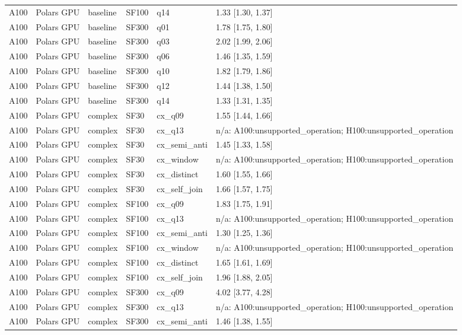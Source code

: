 \begin{longtable}{llllll}
A100 & Polars GPU & baseline & SF100 & q14 & 1.33 [1.30, 1.37] \\
A100 & Polars GPU & baseline & SF300 & q01 & 1.78 [1.75, 1.80] \\
A100 & Polars GPU & baseline & SF300 & q03 & 2.02 [1.99, 2.06] \\
A100 & Polars GPU & baseline & SF300 & q06 & 1.46 [1.35, 1.59] \\
A100 & Polars GPU & baseline & SF300 & q10 & 1.82 [1.79, 1.86] \\
A100 & Polars GPU & baseline & SF300 & q12 & 1.44 [1.38, 1.50] \\
A100 & Polars GPU & baseline & SF300 & q14 & 1.33 [1.31, 1.35] \\
A100 & Polars GPU & complex & SF30 & cx\_q09 & 1.55 [1.44, 1.66] \\
A100 & Polars GPU & complex & SF30 & cx\_q13 & n/a: A100:unsupported\_operation; H100:unsupported\_operation \\
A100 & Polars GPU & complex & SF30 & cx\_semi\_anti & 1.45 [1.33, 1.58] \\
A100 & Polars GPU & complex & SF30 & cx\_window & n/a: A100:unsupported\_operation; H100:unsupported\_operation \\
A100 & Polars GPU & complex & SF30 & cx\_distinct & 1.60 [1.55, 1.66] \\
A100 & Polars GPU & complex & SF30 & cx\_self\_join & 1.66 [1.57, 1.75] \\
A100 & Polars GPU & complex & SF100 & cx\_q09 & 1.83 [1.75, 1.91] \\
A100 & Polars GPU & complex & SF100 & cx\_q13 & n/a: A100:unsupported\_operation; H100:unsupported\_operation \\
A100 & Polars GPU & complex & SF100 & cx\_semi\_anti & 1.30 [1.25, 1.36] \\
A100 & Polars GPU & complex & SF100 & cx\_window & n/a: A100:unsupported\_operation; H100:unsupported\_operation \\
A100 & Polars GPU & complex & SF100 & cx\_distinct & 1.65 [1.61, 1.69] \\
A100 & Polars GPU & complex & SF100 & cx\_self\_join & 1.96 [1.88, 2.05] \\
A100 & Polars GPU & complex & SF300 & cx\_q09 & 4.02 [3.77, 4.28] \\
A100 & Polars GPU & complex & SF300 & cx\_q13 & n/a: A100:unsupported\_operation; H100:unsupported\_operation \\
A100 & Polars GPU & complex & SF300 & cx\_semi\_anti & 1.46 [1.38, 1.55] \\

\end{longtable}
